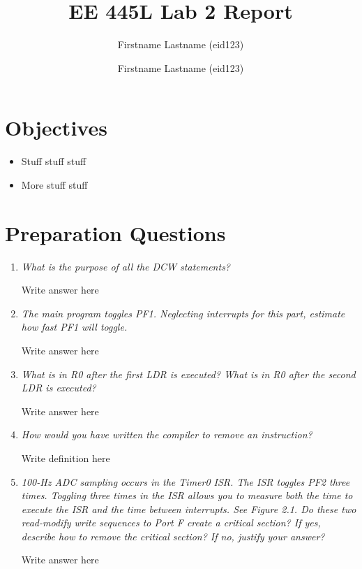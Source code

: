 \documentclass{article}
\title{EE 445L Lab 2 Report}
\author{Firstname Lastname (eid123) \and Firstname Lastname (eid123)} %
\begin{document}
\maketitle

\section{Objectives} %
\begin{itemize}
	\item Stuff stuff stuff %
	\item More stuff stuff
\end{itemize}

\section{Preparation Questions}

\begin{enumerate}
	\item \emph{What is the purpose of all the DCW statements?}

		Write answer here %

	\item \emph{The main program toggles PF1. Neglecting interrupts for this
		part, estimate how fast PF1 will toggle.}

		Write answer here %

	\item \emph{What is in R0 after the first LDR is executed? What is in R0
		after the second LDR is executed?}

		Write answer here %

	\item \emph{How would you have written the compiler to remove an
		instruction?}

		Write definition here %

	\item \emph{100-Hz ADC sampling occurs in the Timer0 ISR. The ISR toggles
		PF2 three times. Toggling three times in the ISR allows you to measure
		both the time to execute the ISR and the time between interrupts. See
		Figure 2.1. Do these two read-modify write sequences to Port F create
		a critical section? If yes, describe how to remove the critical
		section? If no, justify your answer?}

		Write answer here %

\end{enumerate}
\end{document}
